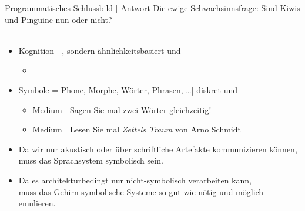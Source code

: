 \begin{frame}
  {Programmatisches Schlussbild | Antwort}
  \onslide<+->
  \onslide<+->
  Die ewige Schwachsinnsfrage: Sind Kiwis und Pinguine nun  oder nicht?\\
  \Viertelzeile
  \\
  \Zeile
  \begin{itemize}[<+->]
    \item \alert{Kognition} | , sondern ähnlichkeitsbasiert und 
      \begin{itemize}[<+->]
        \item {}
      \end{itemize}
      \Halbzeile
    \item \alert{Symbole} = Phone, Morphe, Wörter, Phrasen, \ldots |  diskret und 
      \begin{itemize}[<+->]
        \item {} Medium | Sagen Sie mal zwei Wörter gleichzeitig!
        \item {} Medium | Lesen Sie mal \textit{Zettels Traum} von Arno Schmidt\\
      \end{itemize}
    \Halbzeile
    \item[\ding{222}] Da wir nur akustisch oder über schriftliche Artefakte kommunizieren können,\\
      \alert{muss das Sprachsystem symbolisch sein}.
    \item[\ding{222}] Da es architekturbedingt nur nicht-symbolisch verarbeiten kann,\\
      \alert{muss das Gehirn symbolische Systeme so gut wie nötig und möglich emulieren}.
  \end{itemize}
\end{frame}



